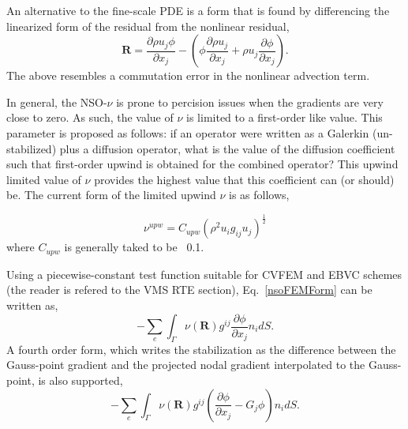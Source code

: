 An alternative to the fine-scale PDE is a form that is found by differencing the linearized
form of the residual from the nonlinear residual,
\begin{equation}
 \mathbf{R} = \frac{\partial \rho u_j \phi }{\partial x_j} - (\phi \frac{\partial \rho u_j }{\partial x_j} + \rho u_j \frac{\partial \phi}{\partial x_j}).
 \label{nsoResidualAlt}
\end{equation}
The above resembles a commutation error in the nonlinear advection term.

In general, the NSO-$\nu$ is prone to percision issues when the gradients are very close to 
zero. As such, the value of $\nu$ is limited to a first-order like value. This parameter is 
proposed as follows: if an operator were written as a Galerkin (un-stabilized) plus a diffusion 
operator, what is the value of the diffusion coefficient such that first-order upwind is obtained 
for the combined operator? This upwind limited value of $\nu$ provides the highest value that 
this coefficient can (or should) be. The current form of the limited upwind $\nu$ is as follows,

\begin{equation}
  \nu^{upw} = C_{upw}(\rho^2  u_i g_{ij} u_j )^{\frac{1}{2}}
\label{nsoFVForm}
\end{equation}
where $C_{upw}$ is generally taked to be ~0.1.

Using a piecewise-constant test function suitable for CVFEM and EBVC schemes (the reader is refered to 
the VMS RTE section), Eq.~\ref{nsoFEMForm} can be written as,
\begin{equation}
  -\sum_e \int_\Gamma \nu(\mathbf{R}) g^{ij} \frac{\partial \phi} {\partial x_j} n_i dS.
\label{nsoFVForm}
\end{equation}
%
A fourth order form, which writes the stabilization as the difference between the Gauss-point gradient 
and the projected nodal gradient interpolated to the Gauss-point, is also supported,
\begin{equation}
  -\sum_e \int_\Gamma \nu(\mathbf{R}) g^{ij} (\frac{\partial \phi} {\partial x_j} - G_j \phi ) n_i dS.
\label{nsoFVForm4th}
\end{equation}

